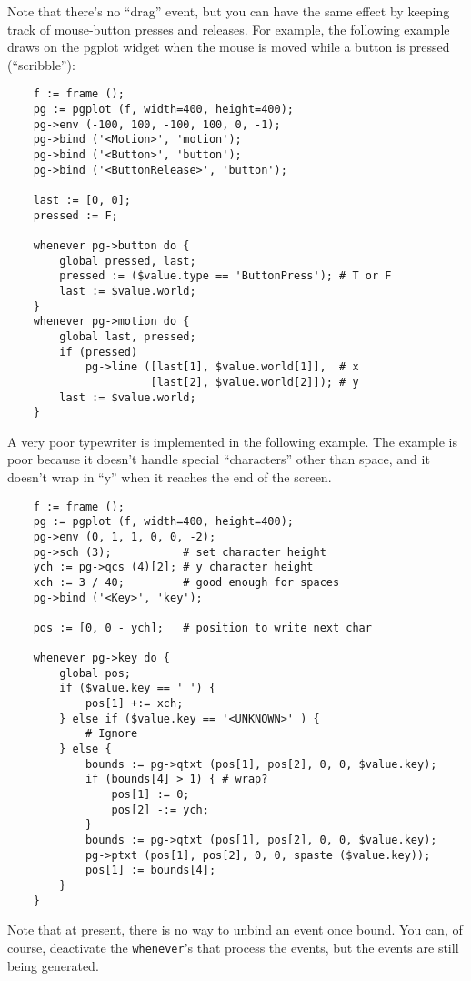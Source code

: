 Note that there's no ``drag'' event, but you can have the same effect
by keeping track of mouse-button presses and releases.  For example,
the following example draws on the pgplot widget when the mouse is
moved while a button is pressed (``scribble''):

\begin{verbatim}
    f := frame ();
    pg := pgplot (f, width=400, height=400);
    pg->env (-100, 100, -100, 100, 0, -1);
    pg->bind ('<Motion>', 'motion');
    pg->bind ('<Button>', 'button');
    pg->bind ('<ButtonRelease>', 'button');

    last := [0, 0];
    pressed := F;

    whenever pg->button do {
        global pressed, last;
        pressed := ($value.type == 'ButtonPress'); # T or F
        last := $value.world;
    }
    whenever pg->motion do {
        global last, pressed;
        if (pressed)
            pg->line ([last[1], $value.world[1]],  # x
                      [last[2], $value.world[2]]); # y
        last := $value.world;
    }
\end{verbatim}

A very poor typewriter is implemented in the
following example.  The example is poor because it doesn't handle
special ``characters'' other than space, and it doesn't wrap in ``y''
when it reaches the end of the screen.

\begin{verbatim}
    f := frame ();
    pg := pgplot (f, width=400, height=400);
    pg->env (0, 1, 1, 0, 0, -2);
    pg->sch (3);           # set character height
    ych := pg->qcs (4)[2]; # y character height
    xch := 3 / 40;         # good enough for spaces
    pg->bind ('<Key>', 'key');

    pos := [0, 0 - ych];   # position to write next char

    whenever pg->key do {
        global pos;
        if ($value.key == ' ') {
            pos[1] +:= xch;
        } else if ($value.key == '<UNKNOWN>' ) {
            # Ignore
        } else {
            bounds := pg->qtxt (pos[1], pos[2], 0, 0, $value.key);
            if (bounds[4] > 1) { # wrap?
                pos[1] := 0;
                pos[2] -:= ych;
            }
            bounds := pg->qtxt (pos[1], pos[2], 0, 0, $value.key);
            pg->ptxt (pos[1], pos[2], 0, 0, spaste ($value.key));
            pos[1] := bounds[4];
        }
    }
\end{verbatim}

Note that at present, there is no way to unbind an event once bound.
You can, of course,  deactivate the {\tt whenever}'s that process the
events, but the events are still being generated.

